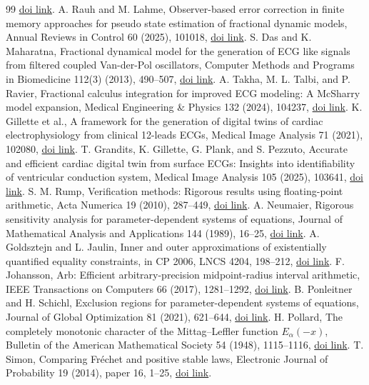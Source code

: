 \documentclass[11pt]{article}
\theoremstyle{definition}
\theoremstyle{remark}
\begin{document}
\begin{thebibliography}{99}
\href{https://doi.org/10.14232/actacyb.296010}{doi link}.
A. Rauh and M. Lahme,
Observer-based error correction in finite memory approaches for pseudo state
estimation of fractional dynamic models, Annual Reviews in Control 60 (2025),
101018,
\href{https://doi.org/10.1016/j.arcontrol.2025.101018}{doi link}.
S. Das and K. Maharatna,
Fractional dynamical model for the generation of ECG like signals from
filtered coupled Van-der-Pol oscillators, Computer Methods and Programs in
Biomedicine 112(3) (2013), 490--507,
\href{https://doi.org/10.1016/j.cmpb.2013.08.012}{doi link}.
A. Takha, M. L. Talbi, and P. Ravier,
Fractional calculus integration for improved ECG modeling: A McSharry model
expansion, Medical Engineering \& Physics 132 (2024), 104237,
\href{https://doi.org/10.1016/j.medengphy.2024.104237}{doi link}.
K. Gillette et al.,
A framework for the generation of digital twins of cardiac electrophysiology
from clinical 12-leads ECGs, Medical Image Analysis 71 (2021), 102080,
\href{https://doi.org/10.1016/j.media.2021.102080}{doi link}.
T. Grandits, K. Gillette, G. Plank, and S. Pezzuto,
Accurate and efficient cardiac digital twin from surface ECGs: Insights into
identifiability of ventricular conduction system, Medical Image Analysis 105
(2025), 103641,
\href{https://doi.org/10.1016/j.media.2025.103641}{doi link}.
S. M. Rump,
Verification methods: Rigorous results using floating-point arithmetic,
Acta Numerica 19 (2010), 287--449,
\href{https://doi.org/10.1017/S096249291000005X}{doi link}.
A. Neumaier,
Rigorous sensitivity analysis for parameter-dependent systems of equations,
Journal of Mathematical Analysis and Applications 144 (1989), 16--25,
\href{https://doi.org/10.1016/0022-247X(89)90357-0}{doi link}.
A. Goldsztejn and L. Jaulin,
Inner and outer approximations of existentially quantified equality
constraints, in CP 2006, LNCS 4204, 198--212,
\href{https://doi.org/10.1007/11889205_16}{doi link}.
F. Johansson,
Arb: Efficient arbitrary-precision midpoint-radius interval arithmetic,
IEEE Transactions on Computers 66 (2017), 1281--1292,
\href{https://doi.org/10.1109/TC.2017.2690633}{doi link}.
B. Ponleitner and H. Schichl,
Exclusion regions for parameter-dependent systems of equations,
Journal of Global Optimization 81 (2021), 621--644,
\href{https://doi.org/10.1007/s10898-021-01082-3}{doi link}.
H. Pollard,
The completely monotonic character of the Mittag--Leffler function
\(E_\alpha(-x)\),
Bulletin of the American Mathematical Society 54 (1948), 1115--1116,
\href{https://doi.org/10.1090/S0002-9904-1948-09132-7}{doi link}.
T. Simon,
Comparing Fr\'echet and positive stable laws,
Electronic Journal of Probability 19 (2014), paper 16, 1--25,
\href{https://doi.org/10.1214/EJP.v19-3058}{doi link}.
\end{thebibliography}
\end{document}
